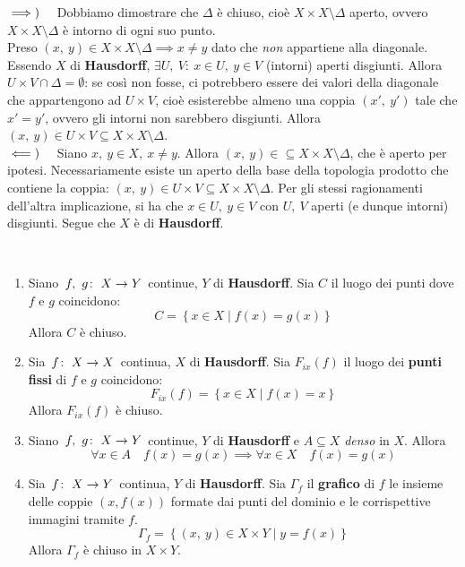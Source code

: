 \begin{demonstration}
$\implies)\quad$ Dobbiamo dimostrare che $\Delta$ è chiuso, cioè $X\times X\setminus \Delta$ aperto, ovvero $X\times X\setminus \Delta$ è intorno di ogni suo punto.\\
Preso $\left(x,\ y\right)\in X\times X\setminus \Delta\implies x\neq y$ dato che \textit{non} appartiene alla diagonale. Essendo $X$ di \textbf{Hausdorff}, $\exists U,\ V:\ x\in U,\ y\in V$ (intorni) aperti  disgiunti. Allora $U\times V\cap \Delta =\emptyset$: se così non fosse, ci potrebbero essere dei valori della diagonale che appartengono ad $U\times V$, cioè esisterebbe almeno una coppia $\left(x',\ y'\right)$ tale che $x'=y'$, ovvero gli intorni non sarebbero disgiunti. Allora $\left(x,\ y\right)\in U\times V\subseteq X\times X\setminus \Delta$.\\
$\impliedby)\quad$ Siano $x,\ y\in X,\ x\neq y$. Allora $\left(x,\ y\right)\in \subseteq X\times X\setminus \Delta$, che è aperto per ipotesi. Necessariamente esiste un aperto della base della topologia prodotto che contiene la coppia: $\left(x,\ y\right)\in U\times V\subseteq X\times X\setminus \Delta$. Per gli stessi ragionamenti dell'altra implicazione, si ha che $x\in U,\ y\in V$ con $U,\ V$ aperti (e dunque intorni) disgiunti. Segue che $X$ è di \textbf{Hausdorff}.
\end{demonstration}
\begin{proposition}~{}
\begin{enumerate}
\item Siano $\funz{f,\ g}{X}{Y}$ continue, $Y$ di \textbf{Hausdorff}. Sia $C$ il luogo dei punti dove $f$ e $g$ coincidono:
\begin{equation}
C=\left\{x\in X\mid f\left(x\right)=g\left(x\right)\right\}
\end{equation}
Allora $C$ è chiuso.
\item  Sia $\funz{f}{X}{X}$ continua, $X$ di \textbf{Hausdorff}.  Sia $F_{ix}\left(f\right)$ il luogo dei \textbf{punti fissi} di $f$ e $g$ coincidono:
\begin{equation}
F_{ix}\left(f\right)=\left\{x\in X\mid f\left(x\right)=x\right\}
\end{equation}
Allora $F_{ix}\left(f\right)$ è chiuso.
\item Siano $\funz{f,\ g}{X}{Y}$ continue, $Y$ di \textbf{Hausdorff} e $A\subseteq X$ \textit{denso} in $X$. Allora
\begin{equation}
\forall x\in A\quad f\left(x\right)=g\left(x\right)\implies \forall x\in X\quad f\left(x\right)=g\left(x\right)
\end{equation}
\item Sia $\funz{f}{X}{Y}$ continua, $Y$ di \textbf{Hausdorff}. Sia $\Gamma_f$ il \textbf{grafico} di $f$ le insieme delle coppie $(x,f\left(x\right))$ formate dai punti del dominio e le corrispettive immagini tramite $f$.
\begin{equation}
\Gamma_f=\left\{\left(x,\ y\right)\in X\times Y\mid y=f\left(x\right)\right\}
\end{equation}
Allora $\Gamma_f$ è chiuso in $X\times Y$.
\end{enumerate}
\end{proposition}
